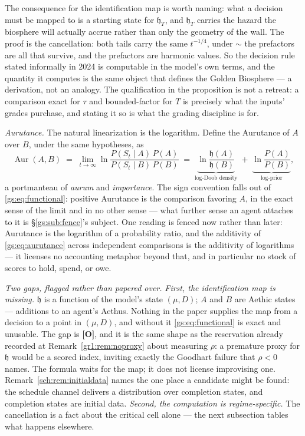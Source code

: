 \documentclass[11pt]{article}
\numberwithin{equation}{section}
\theoremstyle{plain}
\theoremstyle{definition}
\theoremstyle{remark}
\newcommand{\hm}{\mathfrak{h}}
\begin{document}
The consequence for the identification map is worth naming: what a decision must be mapped to
is a starting state for $\hm_T$, and $\hm_T$ carries the hazard the biosphere will actually
accrue rather than only the geometry of the wall. The proof is the cancellation: both tails carry the same $t^{-1/4}$, under $\sim$ the prefactors are all that survive, and the prefactors are harmonic values. So the decision rule stated informally in 2024 is computable in the model's own terms, and the quantity it computes is the same object that defines the Golden Biosphere --- a derivation, not an analogy. The qualification in the proposition is not a retreat: a comparison exact for $\tau$ and bounded-factor for $T$ is precisely what the inputs' grades purchase, and stating it so is what the grading discipline is for.

\emph{Aurutance.} The natural linearization is the logarithm. Define the Aurutance of $A$ over $B$, under the same hypotheses, as
\begin{equation}\label{gs:eq:aurutance}
    \operatorname{Aur}(A, B) \;=\; \lim_{t \to \infty} \ln \frac{P(S_t \mid A)\,P(A)}{P(S_t \mid B)\,P(B)}
    \;=\; \underbrace{\ln \frac{\hm(A)}{\hm(B)}}_{\text{log-Doob density}} \;+\; \underbrace{\ln \frac{P(A)}{P(B)}}_{\text{log-prior}},
\end{equation}
a portmanteau of \emph{aurum} and \emph{importance}. The sign convention falls out of \eqref{gs:eq:functional}: positive Aurutance is the comparison favoring $A$, in the exact sense of the limit and in no other sense --- what further sense an agent attaches to it is \S\ref{gs:sub:fence}'s subject. One reading is fenced now rather than later: Aurutance is the logarithm of a probability ratio, and the additivity of \eqref{gs:eq:aurutance} across independent comparisons is the additivity of logarithms --- it licenses no accounting metaphor beyond that, and in particular no stock of scores to hold, spend, or owe.

\emph{Two gaps, flagged rather than papered over.} \emph{First, the identification map is missing.} $\hm$ is a function of the model's state $(\mu, D)$; $A$ and $B$ are Aethic states --- additions to an agent's Aethus. Nothing in the paper supplies the map from a decision to a point in $(\mu, D)$, and without it \eqref{gs:eq:functional} is exact and unusable. The gap is \textbf{[O]}, and it is the same shape as the reservation already recorded at Remark~\ref{gr1:rem:noproxy} about measuring $\rho$: a premature proxy for $\hm$ would be a scored index, inviting exactly the Goodhart failure that $\rho < 0$ names. The formula waits for the map; it does not license improvising one.
Remark~\ref{sch:rem:initialdata} names the one place a candidate might be
found: the schedule channel delivers a distribution over completion
states, and completion states are initial data. \emph{Second, the computation is regime-specific.} The cancellation is a fact about the critical cell alone --- the next subsection tables what happens elsewhere.
\end{document}
